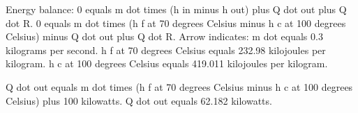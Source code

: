 Energy balance:  
0 equals m dot times (h in minus h out) plus Q dot out plus Q dot R.  
0 equals m dot times (h f at 70 degrees Celsius minus h c at 100 degrees Celsius) minus Q dot out plus Q dot R.  
Arrow indicates:  
m dot equals 0.3 kilograms per second.  
h f at 70 degrees Celsius equals 232.98 kilojoules per kilogram.  
h c at 100 degrees Celsius equals 419.011 kilojoules per kilogram.  

Q dot out equals m dot times (h f at 70 degrees Celsius minus h c at 100 degrees Celsius) plus 100 kilowatts.  
Q dot out equals 62.182 kilowatts.